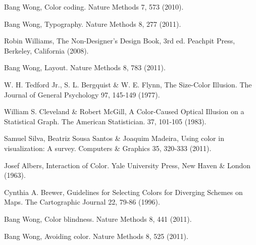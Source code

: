 \documentclass[letterpaper]{article}\usepackage[]{graphicx}\usepackage[]{color}
\begin{document}
\begin{thebibliography}{1}
Bang Wong, Color coding. Nature Methods 7, 573 (2010).

Bang Wong, Typography. Nature Methods 8, 277 (2011).

Robin Williams, The Non-Designer's Design Book, 3rd ed. Peachpit Press, Berkeley, California (2008).

Bang Wong, Layout. Nature Methods 8, 783 (2011).

W. H. Tedford Jr., S. L. Bergquist \& W. E. Flynn, The Size-Color Illusion. The Journal of General Psychology 97, 145-149 (1977).

William S. Cleveland \& Robert McGill, A Color-Caused Optical Illusion on a Statistical Graph. The American Statistician. 37, 101-105 (1983).

Samuel Silva, Beatriz Sousa Santos \& Joaquim Madeira, Using color in visualization: A survey. Computers \& Graphics 35, 320-333 (2011).

Josef Albers, Interaction of Color. Yale University Press, New Haven \& London (1963).

Cynthia A. Brewer, Guidelines for Selecting Colors for Diverging Schemes on Maps. The Cartographic Journal 22, 79-86 (1996).

Bang Wong, Color blindness. Nature Methods 8, 441 (2011).

Bang Wong, Avoiding color. Nature Methods 8, 525 (2011).

\end{thebibliography}
\end{document}
